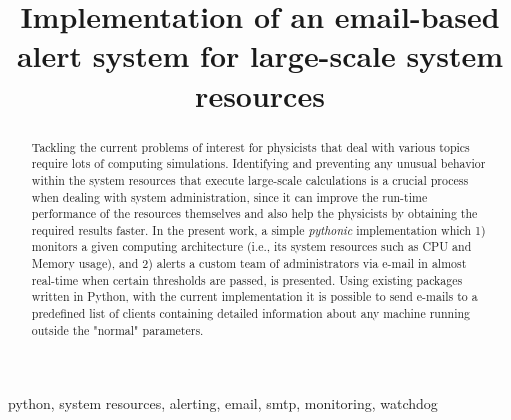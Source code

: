 \documentclass[conference]{IEEEtran}
\begin{document}
\title{Implementation of an email-based alert system for large-scale system resources}

\author{
}

\maketitle

\begin{abstract}
Tackling the current problems of interest for physicists that deal with various topics require lots of computing simulations. Identifying and preventing any unusual behavior within the system resources that execute large-scale calculations is a crucial process when dealing with system administration, since it can improve the run-time performance of the resources themselves and also help the physicists by obtaining the required results faster. In the present work, a simple \emph{pythonic} implementation which 1) monitors a given computing architecture (i.e., its system resources such as CPU and Memory usage), and 2) alerts a custom team of administrators via e-mail in almost real-time when certain thresholds are passed, is presented. Using existing packages written in Python, with the current implementation it is possible to send e-mails to a predefined list of clients containing detailed information about any machine running outside the "normal" parameters.
\end{abstract}

\begin{IEEEkeywords}
python, system resources, alerting, email, smtp, monitoring, watchdog
\end{IEEEkeywords}
\end{document}
